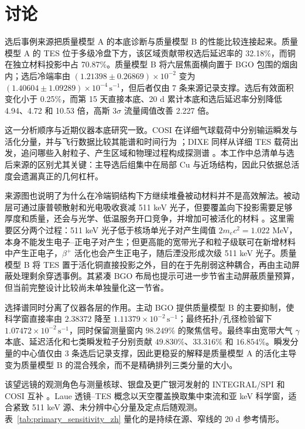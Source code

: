 \documentclass[11pt]{article}
\newcommand{\cps}{\,\mathrm{s^{-1}}}
\begin{document}
\FloatBarrier

\section{讨论}
\label{sec:discussion}

选后事例来源把质量模型 A 的本底诊断与质量模型 B 的性能比较连接起来。质量模型 A 的 TES 位于多级冷盘下方，该区域贡献带权选后延迟率的 32.18\%，而铜在独立材料投影中占 70.87\%。质量模型 B 将六层焦面横向置于 BGO 包围的烟囱内；选后冷端率由 $(1.21398\pm0.26869)\times10^{-2}$ 变为 $(1.40604\pm1.09289)\times10^{-4}\cps$，但后者仅由 7 条来源记录支撑。选后有效面积变化小于 0.25\%，而第 15 天直接本底、20 d 累计本底和选后延迟率分别降低 4.94、4.72 和 10.53 倍，高斯 $3\sigma$ 流量阈值改善 2.227 倍。

这一分析顺序与近期仪器本底研究一致。COSI 在详细气球载荷中分别输运瞬发与活化分量，并与飞行数据比较其能谱和时间行为 \cite{Gallego2025Balloon}；DIXE 同样从详细 TES 载荷出发，追问哪些入射粒子、产生区域和物理过程构成探测谱 \cite{Tian2026DIXE}。本工作中总清单与选后来源的区别尤其关键：主导选后组集中在局部 Cu 与近场结构，因此只依据总活度会遗漏真正的几何杠杆。

来源图也说明了为什么在冷端铜结构下方继续堆叠被动材料并不是高效解法。被动层可通过康普顿散射和光电吸收衰减 511 keV 光子，但要覆盖向下投影需要足够厚度和质量，还会与光学、低温服务开口竞争，并增加可被活化的材料 \cite{NISTXCOM}。这里需要区分两个过程：511 keV 光子低于核场单光子对产生阈值 $2m_ec^2=1.022$ MeV，本身不能发生电子--正电子对产生；但更高能的宽带光子和粒子级联可在新增材料中产生正电子，$\beta^+$ 活化也会产生正电子，随后湮没形成次级 511 keV 光子。质量模型 B 将 TES 置于活化铜直接投影之外，目的在于先削弱这种耦合，再由主动屏蔽处理剩余穿透事例。其紧凑 BGO 布局也提示可进一步节省主动屏蔽质量预算，但当前完整设计比较尚未单独量化这一节省。

选择谱同时分离了仪器各层的作用。主动 BGO 提供质量模型 B 的主要抑制，使科学窗直接率由 $2.38372$ 降至 $1.11379\times10^{-2}\cps$；最终拓扑/孔径检验留下 $1.07472\times10^{-2}\cps$，同时保留测量窗内 $98.249\%$ 的聚焦信号。最终率由宽带大气 $\gamma$ 本底、延迟活化和七类瞬发粒子分别贡献 $49.830\%$、$33.316\%$ 和 $16.854\%$。瞬发分量的中心值仅由 3 条选后记录支撑，因此更稳妥的解释是质量模型 A 的活化主导变为质量模型 B 的混合残余，而不是精确排列三类分量的大小。

该望远镜的观测角色与测量核球、银盘及更广银河发射的 INTEGRAL/SPI 和 COSI 互补 \cite{Siegert2016AA,Kierans2020,Siegert2020COSI,Yoneda2025,Karwin2023}。Laue 透镜--TES 概念以天空覆盖换取集中束流和亚 keV 科学窗，适合紧致 511 keV 源、未分辨中心分量及定点后随观测。表~\ref{tab:primary_sensitivity_zh} 量化的是持续在源、窄线的 20 d 参考情形。
\end{document}
